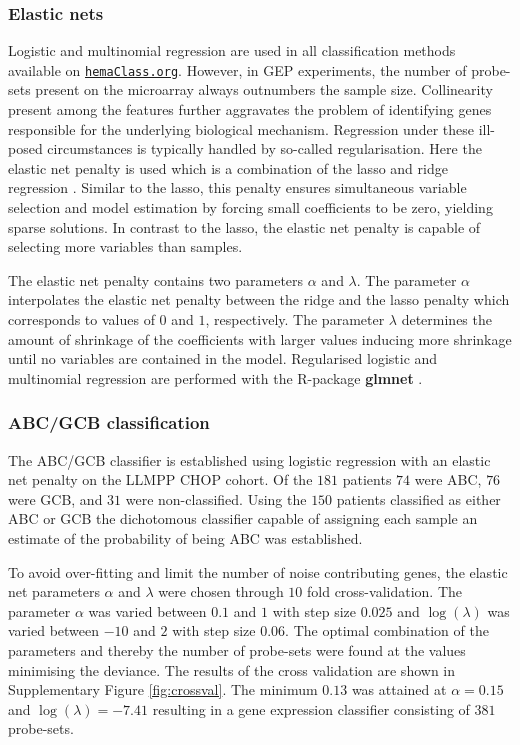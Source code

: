 \documentclass{bmcart}
\newcommand{\hemaClass}{\href{http://hemaClass.org}{\texttt{hemaClass.org}}}
\newcommand{\R}{\textsf{R}}
\newcommand{\pkg}[1]{\textbf{#1}}
\begin{document}
\subsubsection{Elastic nets}
Logistic and multinomial regression are used in all classification methods available on \hemaClass{}.
However, in GEP experiments, the number of probe-sets present on the microarray always outnumbers the sample size.
Collinearity present among the features further aggravates the problem of identifying genes responsible for the underlying biological mechanism.
Regression under these ill-posed circumstances is typically handled by so-called regularisation.
Here the elastic net penalty \citep{Friedman2010, Zou2005} is used which is a combination of the lasso \citep{Tibshirani1996} and ridge regression \citep{Hoerl1970}.
Similar to the lasso, this penalty ensures simultaneous variable selection and model estimation by forcing small coefficients to be zero, yielding sparse solutions.
In contrast to the lasso, the elastic net penalty is capable of selecting more variables than samples.

The elastic net penalty contains two parameters $\alpha$ and $\lambda$.
The parameter $\alpha$ interpolates the elastic net penalty between the ridge and the lasso penalty which corresponds to values of $0$ and $1$, respectively.
The parameter $\lambda$ determines the amount of shrinkage of the coefficients with larger values inducing more shrinkage until no variables are contained in the model.
Regularised logistic and multinomial regression are performed with the \R{}-package \pkg{glmnet} \citep{Friedman2010}.



\subsubsection{ABC/GCB classification}
The ABC/GCB classifier is established using logistic regression with an elastic net penalty on the LLMPP CHOP cohort.
Of the $181$ patients $74$ were ABC, $76$ were GCB, and $31$ were non-classified.
Using the $150$ patients classified as either ABC or GCB the dichotomous classifier capable of assigning each sample an estimate of the probability of being ABC was established.

To avoid over-fitting and limit the number of noise contributing genes, the elastic net parameters $\alpha$ and $\lambda$ were chosen through $10$ fold cross-validation.
The parameter $\alpha$ was varied between $0.1$ and $1$ with step size $0.025$ and $\log(\lambda)$ was varied between $-10$ and $2$ with step size $0.06$.
The optimal combination of the parameters and thereby the number of probe-sets were found at the values minimising the deviance.
The results of the cross validation are shown in Supplementary Figure \ref{fig:crossval}.
The minimum $0.13$ was attained at $\alpha = 0.15$ and $\log(\lambda) = -7.41$ resulting in a gene expression classifier consisting of $381$ probe-sets.
\end{document}
